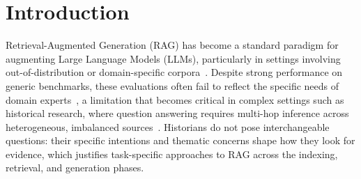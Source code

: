 \section{Introduction}
\label{sec:intro}




Retrieval-Augmented Generation (RAG) has become a standard paradigm for
augmenting Large Language Models (LLMs), particularly in settings
involving out-of-distribution or domain-specific
corpora~\cite{rag_2020,rag_survey}. Despite strong performance on
generic benchmarks, these evaluations often fail to reflect the
specific needs of domain experts~\cite{Chen_Lin_Han_Sun_2024,domainrag},
a limitation that becomes critical in complex settings such as
historical research, where question answering requires multi-hop
inference across heterogeneous, imbalanced
sources~\cite{historiqa-pellet}. Historians do not pose interchangeable
questions: their specific intentions and thematic concerns shape how
they look for evidence, which justifies task-specific approaches to
RAG across the indexing, retrieval, and generation phases.




